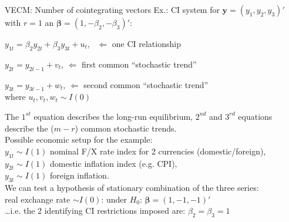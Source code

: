 \documentclass[usenames,dvipsnames]{beamer}
\begin{document}
\begin{frame}{VECM: Number of cointegrating vectors}
\footnotesize
Ex.: CI system for $\bm{y} = (y_1, y_2, y_3)'$ with $r=1$ an $\bm{\beta} = (1, -\beta_2, -\beta_3)'$:
\begin{enumerate}[ {[}1{]} ]
\item $y_{1t} = \beta_2 y_{2t} + \beta_3 y_{3t} + u_t$, \  $\Leftarrow$ one CI relationship
\item $y_{2t} = y_{2t-1} + v_t$, \hspace*{1.20cm} $\Leftarrow$ first common ``stochastic trend''
\item $y_{3t} = y_{3t-1} + w_t$, \hspace*{1.12cm} $\Leftarrow$ second common ``stochastic trend''\\
where $u_t, v_t, w_t \sim I(0)$
\end{enumerate}
The $1^{st}$ equation describes the long-run equilibrium, $2^{nd}$ and $3^{rd}$ equations describe the ($m-r$) common stochastic trends.\\
\medskip
Possible economic setup for the example:\\
\medskip
$y_{1t} \sim I(1)$ nominal F/X rate index for 2 currencies (domestic/foreign), \\ 
$y_{2t} \sim I(1)$ domestic inflation index (e.g. CPI), \\
$y_{3t} \sim I(1)$ foreign inflation. \\
\medskip
We can test a hypothesis of stationary combination of the three series:\\  real exchange rate $\sim I(0)$: under $H_0$: $\bm{\beta} = (1, -1, -1)'$ \\ \dots i.e. the 2 identifying CI restrictions imposed are: $\beta_2 = \beta_3 = 1$ 
\end{frame}
\end{document}
